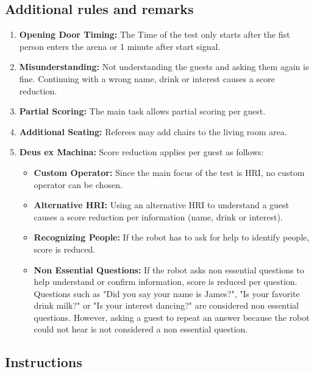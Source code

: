 \subsection*{Additional rules and remarks}
\begin{enumerate}[nosep]
	\item \textbf{Opening Door Timing:} The Time of the test only starts after the fist person enters the arena or 1 minute after start signal.

	\item \textbf{Misunderstanding:} Not understanding the guests and asking them again is fine. Continuing with a wrong name, drink or interest causes a score reduction.
		
	\item \textbf{Partial Scoring:} The main task allows partial scoring per guest.

	\item \textbf{Additional Seating:} Referees may add chairs to the living room area.
	
	\item \textbf{Deus ex Machina:} Score reduction applies per guest as follows:
	\begin{itemize}[nosep]
		\item \textbf{Custom Operator:} Since the main focus of the test is HRI, no custom operator can be chosen.
		\item \textbf{Alternative HRI:} Using an alternative HRI to understand a guest causes a score reduction per information (name, drink or interest).
		\item \textbf{Recognizing People:} If the robot has to ask for help to identify people, score is reduced. 
		\item \textbf{Non Essential Questions:} If the robot asks non essential questions to help understand or confirm information, score is reduced per question. 
		Questions such as "Did you say your name is James?", "Is your favorite drink milk?" or "Is your interest dancing?" are considered non essential questions. 
		However, asking a guest to repeat an answer because the robot could not hear is not considered a non essential question.
	\end{itemize}
\end{enumerate}


\subsection*{Instructions}

